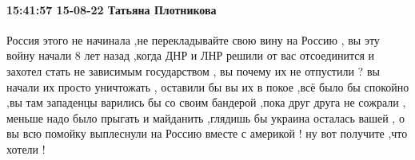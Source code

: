  
 
 
 
 

\paragraph{15:41:57 15-08-22 Татьяна Плотникова}

Россия этого не начинала ,не перекладывайте свою вину на Россию , вы эту войну
начали 8 лет назад ,когда ДНР и ЛНР решили от вас отсоединится и захотел стать
не зависимым государством , вы почему их не отпустили ? вы начали их просто
уничтожать , оставили бы вы их в покое ,всё было бы спокойно ,вы там западенцы
варились бы со своим бандерой ,пока друг друга не сожрали , меньше надо было
прыгать и майданить ,глядишь бы украина осталась вашей , о вы всю помойку
выплеснули на Россию вместе с америкой ! ну вот получите ,что хотели !
